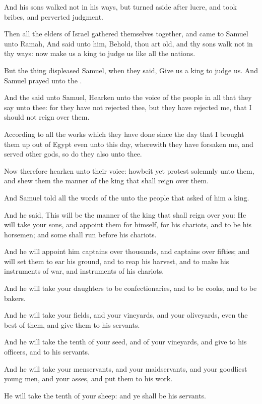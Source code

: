 \verse And his sons walked not in his ways, but turned aside after lucre, and took bribes, and perverted judgment.

\verse Then all the elders of Israel gathered themselves together, and came to Samuel unto Ramah, \verse And said unto him, Behold, thou art old, and thy sons walk not in thy ways: now make us a king to judge us like all the nations.

\verse But the thing displeased Samuel, when they said, Give us a king to judge us. And Samuel prayed unto the \LORD.

\verse And the \LORD said unto Samuel, Hearken unto the voice of the people in all that they say unto thee: for they have not rejected thee, but they have rejected me, that I should not reign over them.

\verse According to all the works which they have done since the day that I brought them up out of Egypt even unto this day, wherewith they have forsaken me, and served other gods, so do they also unto thee.

\verse Now therefore hearken unto their voice: howbeit yet protest solemnly unto them, and shew them the manner of the king that shall reign over them.

\verse And Samuel told all the words of the \LORD unto the people that asked of him a king.

\verse And he said, This will be the manner of the king that shall reign over you: He will take your sons, and appoint them for himself, for his chariots, and to be his horsemen; and some shall run before his chariots.

\verse And he will appoint him captains over thousands, and captains over fifties; and will set them to ear his ground, and to reap his harvest, and to make his instruments of war, and instruments of his chariots.

\verse And he will take your daughters to be confectionaries, and to be cooks, and to be bakers.

\verse And he will take your fields, and your vineyards, and your oliveyards, even the best of them, and give them to his servants.

\verse And he will take the tenth of your seed, and of your vineyards, and give to his officers, and to his servants.

\verse And he will take your menservants, and your maidservants, and your goodliest young men, and your asses, and put them to his work.

\verse He will take the tenth of your sheep: and ye shall be his servants.

